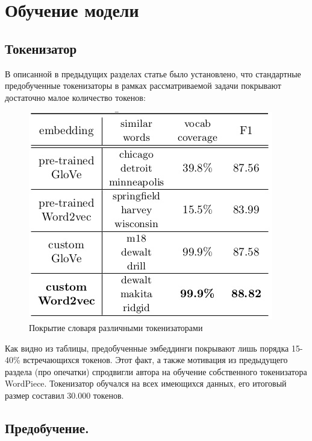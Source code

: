 \documentclass[12pt,a4paper]{article}
\begin{document}
  
\section{Обучение модели}

\subsection{Токенизатор}

В описанной в предыдущих разделах статье \cite{ner} было установлено, что стандартные предобученные токенизаторы в рамках рассматриваемой задачи покрывают достаточно малое количество токенов:

\begin{figure}[H]
	\begin{center}
		\includegraphics[scale=0.4]{tab2.jpg}
	\end{center}
	\caption{Покрытие словаря различными токенизаторами \cite{ner}}
\end{figure}

\noindent Как видно из таблицы, предобученные эмбеддинги покрывают лишь порядка 15-40\% встречающихся токенов. Этот факт, а также мотивация из предыдущего раздела (про опечатки) спродвигли автора на обучение собственного токенизатора WordPiece. Токенизатор обучался на всех имеющихся данных, его итоговый размер составил 30.000 токенов.

\subsection{Предобучение.}
\end{document}
